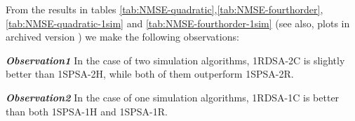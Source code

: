 
From the results in tables \ref{tab:NMSE-quadratic},\ref{tab:NMSE-fourthorder},
\ref{tab:NMSE-quadratic-1sim} and \ref{tab:NMSE-fourthorder-1sim} (see also, plots in
archived version \cite{2017arXiv170206250K}) we make the following observations:

\textit{\textbf{Observation1}} In the case of two simulation algorithms, 
1RDSA-2C is slightly better than 1SPSA-2H, while both of them outperform 1SPSA-2R.

\textit{\textbf{Observation2}} In the case of one simulation algorithms, 
1RDSA-1C is better than both 1SPSA-1H and 1SPSA-1R.

